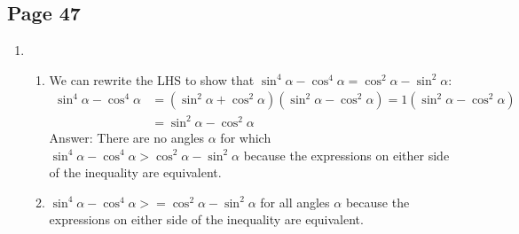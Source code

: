 \documentclass{article}
\newenvironment{solutions}[1]
{\subsection*{#1}
 \begin{enumerate}[leftmargin=1.5em]}
{\end{enumerate}}
\newcommand{\solution}{\item}
\newenvironment{subsolutions}
{\begin{enumerate}}
{\end{enumerate}}
\newcommand{\subsolution}{\item}
\begin{document}
\begin{solutions}{Page 47}
\begin{subsolutions}
\subsolution %
$\begin{aligned}[t]
\frac{1 - \cos{\alpha}}{1 + \cos{\alpha}} &= \frac{(1 - \cos{\alpha})(1 + \cos{\alpha})}{(1 + \cos{\alpha})(1 + \cos{\alpha})} = \frac{1 + \cos{\alpha} - \cos{\alpha} - \cos^{2}{\alpha}}{(1 + \cos{\alpha})^2} \\
&= \frac{1 - \cos^{2}{\alpha}}{(1 + \cos{\alpha})^2} = \frac{\sin^{2}{\alpha}}{(1 + \cos{\alpha})^2} \\
&= \left(\frac{\sin{\alpha}}{1 + \cos{\alpha}}\right)^2
\end{aligned}$

\subsolution %
The key to solving this one is the formula for factoring a difference of cubes: $a^3 - b^3 = (a - b)(a^2 + ab + b^2)$.
\begin{align*}
\frac{\sin^{3}{\alpha} - \cos^{3}{\alpha}}{\sin{\alpha} - \cos{\alpha}} &= \frac{(\sin{\alpha} - \cos{\alpha})(\sin^{2}{\alpha} + \sin{\alpha}\cos{\alpha} + \cos^{2}{\alpha})}{\sin{\alpha} - \cos{\alpha}} \\
&= \sin^{2}{\alpha} + \sin{\alpha}\cos{\alpha} + \cos^{2}{\alpha} \\
&= 1 + \sin{\alpha}\cos{\alpha}
\end{align*}
\end{subsolutions}

\solution %
\begin{subsolutions}

\subsolution %
We can rewrite the LHS to show that $\sin^{4}{\alpha} - \cos^{4}{\alpha} = \cos^{2}{\alpha} - \sin^{2}{\alpha}$:
\begin{align*}
\sin^{4}{\alpha} - \cos^{4}{\alpha} &= (\sin^{2}{\alpha} + \cos^{2}{\alpha})(\sin^{2}{\alpha} - \cos^{2}{\alpha}) = 1(\sin^{2}{\alpha} - \cos^{2}{\alpha}) \\
&= \sin^{2}{\alpha} - \cos^{2}{\alpha}
\end{align*}
Answer: There are no angles $\alpha$ for which $\sin^{4}{\alpha} - \cos^{4}{\alpha} > \cos^{2}{\alpha} - \sin^{2}{\alpha}$ because the expressions on either side of the inequality are equivalent.

\subsolution %
$\sin^{4}{\alpha} - \cos^{4}{\alpha} >= \cos^{2}{\alpha} - \sin^{2}{\alpha}$ for all angles $\alpha$ because the expressions on either side of the inequality are equivalent.

\end{subsolutions}


\end{solutions}
\end{document}
